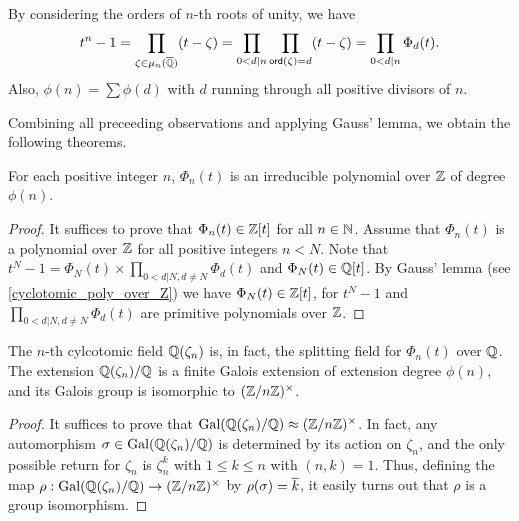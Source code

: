 \begin{obs}
    By considering the orders of $n$-th roots of unity, we have
    \begin{align*}
        t^n-1=\prod_{\zeta\in\mu_n(\overline{{\mathbb{Q}}})}(t-\zeta)=\prod_{0<d|n}\prod_{\textsf{ord}(\zeta)=d}(t-\zeta)=\prod_{0<d|n}\Phi_d(t).
    \end{align*}
    Also, $\phi(n)=\sum\phi(d)$ with $d$ running through all positive divisors of $n$.
\end{obs}
Combining all preceeding observations and applying Gauss' lemma, we obtain the following theorems.
\begin{thm}
    For each positive integer $n$, $\Phi_n(t)$ is an irreducible polynomial over ${\mathbb{Z}}$ of degree $\phi(n)$.
\end{thm}
\begin{proof}
    It suffices to prove that $\Phi_n(t)\in{\mathbb{Z}}[t]$ for all $n\in{\mathbb{N}}$.
    Assume that $\Phi_n(t)$ is a polynomial over ${\mathbb{Z}}$ for all positive integers $n<N$.
    Note that $t^N-1=\Phi_N(t)\times\prod_{0<d|N, d\neq N}\Phi_d(t)$ and $\Phi_N(t)\in{\mathbb{Q}}[t]$.
    By Gauss' lemma (see \cref{cyclotomic_poly_over_Z}) we have $\Phi_N(t)\in{\mathbb{Z}}[t]$, for $t^N-1$ and $\prod_{0<d|N, d\neq N}\Phi_d(t)$ are primitive polynomials over ${\mathbb{Z}}$.
\end{proof}
\begin{thm}
    The $n$-th cylcotomic field ${\mathbb{Q}}(\zeta_n)$ is, in fact, the splitting field for $\Phi_n(t)$ over ${\mathbb{Q}}$.
    The extension ${\mathbb{Q}}(\zeta_n)/{\mathbb{Q}}$ is a finite Galois extension of extension degree $\phi(n)$, and its Galois group is isomorphic to $({\mathbb{Z}}/n{\mathbb{Z}})^\times$.
\end{thm}
\begin{proof}
    It suffices to prove that ${\textrm{Gal}({{\mathbb{Q}}(\zeta_n)/{\mathbb{Q}}})}\approx({\mathbb{Z}}/n{\mathbb{Z}})^\times$.
    In fact, any automorphism $\sigma\in{\textrm{Gal}({{\mathbb{Q}}(\zeta_n)/{\mathbb{Q}}})}$ is determined by its action on $\zeta_n$, and the only possible return for $\zeta_n$ is $\zeta_n^k$ with $1\leq k\leq n$ with $(n, k)=1$.
    Thus, defining the map $\rho: {\textrm{Gal}({{\mathbb{Q}}(\zeta_n)/{\mathbb{Q}}})}\rightarrow({\mathbb{Z}}/n{\mathbb{Z}})^\times$ by $\rho(\sigma)=\overline{k}$, it easily turns out that $\rho$ is a group isomorphism.
\end{proof}

